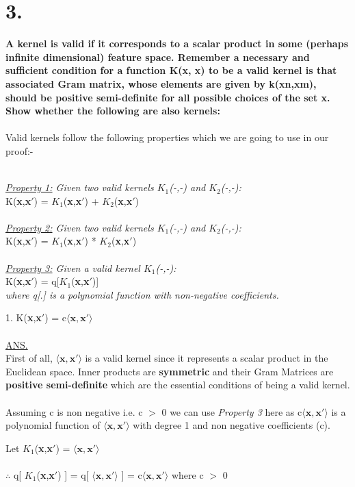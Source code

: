 \documentclass{article}
\begin{document}
\section*{3.}
\textbf{A kernel is valid if it corresponds to a scalar product in some (perhaps infinite dimensional) feature space. Remember a necessary and sufficient condition for a function K(x, x) to be a valid kernel is that associated Gram matrix, whose elements are given by k(xn,xm), should be positive semi-definite for all possible choices of the set x. Show whether the following are also kernels:}
\\~\\
Valid kernels follow the following properties which we are going to use in our proof:- 
\\~\\
\begin{center}
\textit{\underline{Property 1:} Given two valid kernels $K_1$(-,-) and $K_2$(-,-):} \\
K(\textbf{x},\textbf{x$'$}) = $K_1$(\textbf{x},\textbf{x$'$}) + $K_2$(\textbf{x},\textbf{x$'$})
\\~\\
\textit{\underline{Property 2:} Given two valid kernels $K_1$(-,-) and $K_2$(-,-):} \\
K(\textbf{x},\textbf{x$'$}) = $K_1$(\textbf{x},\textbf{x$'$}) * $K_2$(\textbf{x},\textbf{x$'$}) 
\\~\\
\textit{\underline{Property 3:} Given a valid kernel $K_1$(-,-):} \\
K(\textbf{x},\textbf{x$'$}) = q[$K_1$(\textbf{x},\textbf{x$'$})]\\
\textit{where q[.] is a polynomial function with non-negative coefficients.}

\end{center}
1. K(\textbf{x},\textbf{x$'$}) = c$\langle \textbf{x},\textbf{x$'$} \rangle$
\\~\\
\underline{ANS.} \\
First of all, $\langle \textbf{x},\textbf{x$'$} \rangle$ is a valid kernel since it represents a scalar product in the Euclidean space. Inner products are \textbf{symmetric} and their Gram Matrices are \textbf{positive semi-definite} which are the essential conditions of being a valid kernel. 
\\~\\
Assuming c is non negative i.e. c $>$ 0 we can use \textit{Property 3} here as c$\langle \textbf{x},\textbf{x$'$} \rangle$ is a polynomial function of $\langle \textbf{x},\textbf{x$'$} \rangle$ with degree 1 and non negative coefficients (c).
\begin{center}
 Let $K_1$(\textbf{x},\textbf{x$'$}) = $\langle \textbf{x},\textbf{x$'$} \rangle$ 
 \\~\\
$\therefore$    q[ $K_1$(\textbf{x},\textbf{x$'$}) ] = q[ $\langle \textbf{x},\textbf{x$'$} \rangle$ ] = c$\langle \textbf{x},\textbf{x$'$} \rangle$ \quad where c $>$ 0
\end{center}
\end{document}

